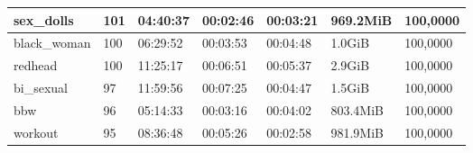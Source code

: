 \begin{table}[]
\begin{tabular}{l|l|l|l|l|l|l}
sex\_dolls                                         & 101                                                 & 04:40:37                                                 & 00:02:46                                                & 00:03:21                                               & 969.2MiB                                             & 100,0000                                                      \\ \hline
black\_woman                                       & 100                                                 & 06:29:52                                                 & 00:03:53                                                & 00:04:48                                               & 1.0GiB                                               & 100,0000                                                      \\ \hline
redhead                                            & 100                                                 & 11:25:17                                                 & 00:06:51                                                & 00:05:37                                               & 2.9GiB                                               & 100,0000                                                      \\ \hline
bi\_sexual                                         & 97                                                  & 11:59:56                                                 & 00:07:25                                                & 00:04:47                                               & 1.5GiB                                               & 100,0000                                                      \\ \hline
bbw                                                & 96                                                  & 05:14:33                                                 & 00:03:16                                                & 00:04:02                                               & 803.4MiB                                             & 100,0000                                                      \\ \hline
workout                                            & 95                                                  & 08:36:48                                                 & 00:05:26                                                & 00:02:58                                               & 981.9MiB                                             & 100,0000                                                      \\ \hline

\end{tabular}
\end{table}
